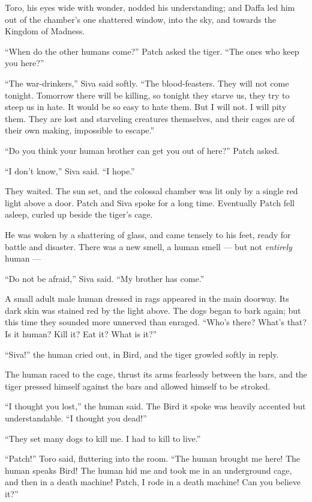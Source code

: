 \documentclass[ebook,oneside,openany,12pt]{memoir}
\begin{document}
Toro, his eyes wide with wonder, nodded his understanding; and Daffa
led him out of the chamber’s one shattered window, into the sky, and
towards the Kingdom of Madness.

“When do the other humans come?” Patch asked the tiger. “The ones who
keep you here?”

“The war-drinkers,” Siva said softly. “The blood-feasters. They will
not come tonight. Tomorrow there will be killing, so tonight they
starve us, they try to steep us in hate. It would be so easy to hate
them. But I will not. I will pity them. They are lost and starveling
creatures themselves, and their cages are of their own making,
impossible to escape.”

“Do you think your human brother can get you out of here?” Patch
asked.

“I don’t know,” Siva said. “I hope.”

They waited. The sun set, and the colossal chamber was lit only by a
single red light above a door. Patch and Siva spoke for a long
time. Eventually Patch fell asleep, curled up beside the tiger’s cage.

He was woken by a shattering of glass, and came tensely to his feet,
ready for battle and disaster. There was a new smell, a human smell —
but not \emph{entirely} human —

“Do not be afraid,” Siva said. “My brother has come.”

A small adult male human dressed in rags appeared in the main
doorway. Its dark skin was stained red by the light above. The dogs
began to bark again; but this time they sounded more unnerved than
enraged. “Who’s there? What’s that? Is it human? Kill it? Eat it?
What is it?”

“Siva!” the human cried out, in Bird, and the tiger growled softly in
reply.

The human raced to the cage, thrust its arms fearlessly between the
bars, and the tiger pressed himself against the bars and allowed
himself to be stroked.

“I thought you lost,” the human said. The Bird it spoke was heavily
accented but understandable. “I thought you dead!”

“They set many dogs to kill me. I had to kill to live.”

“Patch!” Toro said, fluttering into the room. “The human brought me
here! The human speaks Bird! The human hid me and took me in an
underground cage, and then in a death machine! Patch, I rode in a
death machine! Can you believe it?”
\end{document}
